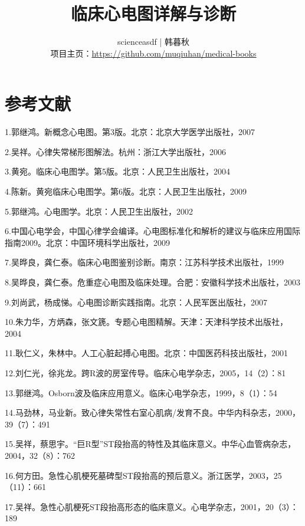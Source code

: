 \documentclass[
  12pt,
  twoside,
  banjiao]{ctexbook}
\title{临床心电图详解与诊断}
\author{scienceasdf | 韩暮秋 \\ 项目主页：\url{https://github.com/muqiuhan/medical-books}}
\begin{document}
\maketitle
\frontmatter
{
\setcounter{tocdepth}{1}
\tableofcontents
{}
}
\newpage

\mainmatter





\appendix
\part{参考文献}

1.郭继鸿。新概念心电图。第3版。北京：北京大学医学出版社，2007

2.吴祥。心律失常梯形图解法。杭州：浙江大学出版社，2006

3.黄宛。临床心电图学。第5版。北京：人民卫生出版社，2004

4.陈新。黄宛临床心电图学。第6版。北京：人民卫生出版社，2009

5.郭继鸿。心电图学。北京：人民卫生出版社，2002

6.中国心电学会，中国心律学会编译。心电图标准化和解析的建议与临床应用国际指南2009。北京：中国环境科学出版社，2009

7.吴晔良，龚仁泰。临床心电图鉴别诊断。南京：江苏科学技术出版社，1999

8.吴晔良，龚仁泰。危重症心电图及临床处理。合肥：安徽科学技术出版社，2003

9.刘尚武，杨成悌。心电图诊断实践指南。北京：人民军医出版社，2007

10.朱力华，方炳森，张文篪。专题心电图精解。天津：天津科学技术出版社，2004

11.耿仁义，朱林中。人工心脏起搏心电图。北京：中国医药科技出版社，2001

12.刘仁光，徐兆龙。跨R波的房室传导。临床心电学杂志，2005，14（2）：81

13.郭继鸿。Osborn波及临床应用意义。临床心电学杂志，1999，8（1）：54

14.马劲林，马业新。致心律失常性右室心肌病/发育不良。中华内科杂志，2000，39（7）：491

15.吴祥，蔡思宇。“巨R型”ST段抬高的特性及其临床意义。中华心血管病杂志，2004，32（8）：762

16.何方田。急性心肌梗死墓碑型ST段抬高的预后意义。浙江医学，2003，25（11）：661

17.吴祥。急性心肌梗死ST段抬高形态的临床意义。心电学杂志，2001，20（3）：189
\end{document}
